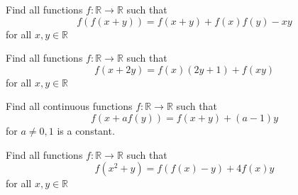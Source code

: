 \begin{problem}
Find all functions $f: \mathbb{R} \to \mathbb{R}$ such that $$f(f(x+y))=f(x+y)+f(x)f(y)-xy$$ for all $x,y \in \mathbb{R}$
\begin{hint}
\addhint{}
\end{hint}
\end{problem}

\begin{problem}
Find all functions $f: \mathbb{R} \to \mathbb{R}$ such that $$f(x+2y)=f(x)(2y+1)+f(xy)$$ for all $x,y \in \mathbb{R}$
\begin{hint}
\addhint{}
\end{hint}
\end{problem}

\begin{problem}
Find all continuous functions $f: \mathbb{R} \to \mathbb{R}$ such that $$f(x+af(y))=f(x+y)+(a-1)y$$ for $a\neq 0,1$ is a constant.
\begin{hint}
\addhint{}
\end{hint}
\end{problem}
\begin{problem}
Find all functions $f: \mathbb{R} \to \mathbb{R}$ such that $$f(x^2+y)=f(f(x)-y)+4f(x)y$$ for all $x,y \in \mathbb{R}$
\begin{hint}
\addhint{}
\end{hint}
\end{problem}